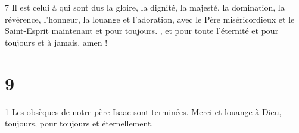 \par 7 Il est celui à qui sont dus la gloire, la dignité, la majesté, la domination, la révérence, l'honneur, la louange et l'adoration, avec le Père miséricordieux et le Saint-Esprit maintenant et pour toujours. , et pour toute l'éternité et pour toujours et à jamais, amen !

\chapter{9}

\par 1 Les obsèques de notre père Isaac sont terminées. Merci et louange à Dieu, toujours, pour toujours et éternellement.



